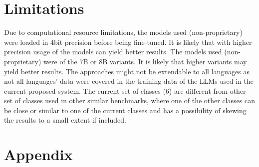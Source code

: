\documentclass[11pt]{article}
\begin{document}

\section*{Limitations}
Due to computational resource limitations, the models used (non-proprietary) were loaded in 4bit precision before being fine-tuned. It is likely that with higher precision usage of the models can yield better results. The models used (non-proprietary) were of the 7B or 8B variants. It is likely that higher variants may yield better results. The approaches might not be extendable to all languages as not all languages' data were covered in the training data of the LLMs used in the current proposed system. The current set of classes (6) are different from other set of classes used in other similar benchmarks, where one of the other classes can be close or similar to one of the current classes and has a possibility of skewing the results to a small extent if included.




\appendix
\section{Appendix}
\label{Appendix}
\end{document}

